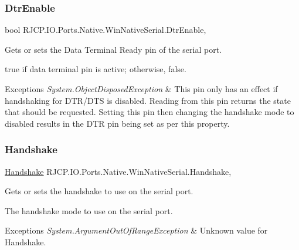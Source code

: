 \subsubsection{\texorpdfstring{DtrEnable}{DtrEnable}}
{\footnotesize\ttfamily bool R\+J\+C\+P.\+I\+O.\+Ports.\+Native.\+Win\+Native\+Serial.\+Dtr\+Enable\hspace{0.3cm}{\ttfamily [get]}, {\ttfamily [set]}}



Gets or sets the Data Terminal Ready pin of the serial port. 

{\ttfamily true} if data terminal pin is active; otherwise, {\ttfamily false}. 


\begin{DoxyExceptions}{Exceptions}
{\em System.\+Object\+Disposed\+Exception} & This pin only has an effect if handshaking for D\+T\+R/\+D\+TS is disabled. Reading from this pin returns the state that should be requested. Setting this pin then changing the handshake mode to disabled results in the D\+TR pin being set as per this property. \\
\hline
\end{DoxyExceptions}
\mbox{\label{class_r_j_c_p_1_1_i_o_1_1_ports_1_1_native_1_1_win_native_serial_abdd9c9b2d62c5ef94b975adfdd961dab}} 
\subsubsection{\texorpdfstring{Handshake}{Handshake}}
{\footnotesize\ttfamily \mbox{\hyperlink{namespace_r_j_c_p_1_1_i_o_1_1_ports_a5328e888558ed5726b3fb7b8b692527c}{Handshake}} R\+J\+C\+P.\+I\+O.\+Ports.\+Native.\+Win\+Native\+Serial.\+Handshake\hspace{0.3cm}{\ttfamily [get]}, {\ttfamily [set]}}



Gets or sets the handshake to use on the serial port. 

The handshake mode to use on the serial port. 


\begin{DoxyExceptions}{Exceptions}
{\em System.\+Argument\+Out\+Of\+Range\+Exception} & Unknown value for Handshake.\\
\hline
\end{DoxyExceptions}
\mbox{\label{class_r_j_c_p_1_1_i_o_1_1_ports_1_1_native_1_1_win_native_serial_a4dfb0aaa0ac8a6591d682133bff22a37}} 
